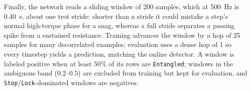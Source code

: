 Finally, the network reads a sliding window of 200 samples, which at 500~Hz is 0.40~s, about one trot stride: shorter than a stride it could mistake a step's normal high-torque phase for a snag, whereas a full stride separates a passing spike from a sustained resistance. Training advances the window by a hop of 25 samples for many decorrelated examples; evaluation uses a dense hop of 1 so every timestep yields a prediction, matching the online detector. A window is labeled positive when at least $50\%$ of its rows are \texttt{Entangled}; windows in the ambiguous band ($0.2$--$0.5$) are excluded from training but kept for evaluation, and \texttt{Stop}/\texttt{Lock}-dominated windows are negatives.

